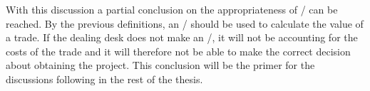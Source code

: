 \documentclass[main.tex]{subfiles}
\begin{document}
    With this discussion a partial conclusion on the appropriateness of \FVA/ can be reached.
    By the previous definitions, an \FVA/ should be used to calculate the value of a trade.
    If the dealing desk does not make an \FVA/, it will not be accounting for the costs of the trade
    and it will therefore not be able to make the correct decision about obtaining the project.
    This conclusion will be the primer for the discussions following in the rest of the thesis.
    
\end{document}
